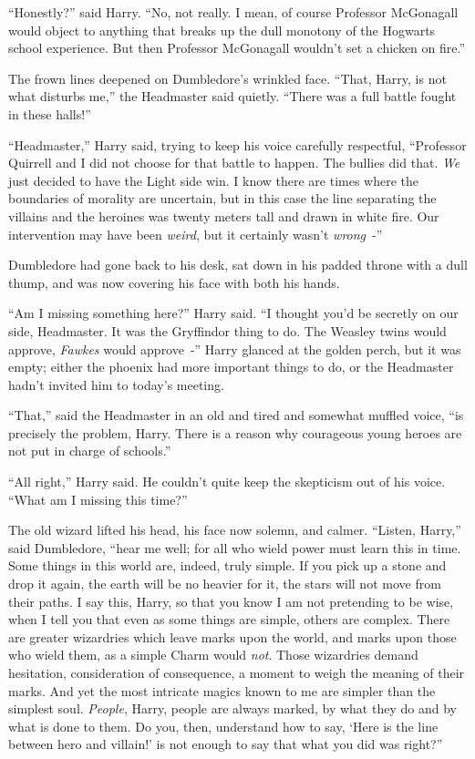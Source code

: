 ``Honestly?'' said Harry. ``No, not really. I mean, of course Professor McGonagall would object to anything that breaks up the dull monotony of the Hogwarts school experience. But then Professor McGonagall wouldn't set a chicken on fire.''

The frown lines deepened on Dumbledore's wrinkled face. ``That, Harry, is not what disturbs me,'' the Headmaster said quietly. ``There was a full battle fought in these halls!''

``Headmaster,'' Harry said, trying to keep his voice carefully respectful, ``Professor Quirrell and I did not choose for that battle to happen. The bullies did that. \emph{We} just decided to have the Light side win. I know there are times where the boundaries of morality are uncertain, but in this case the line separating the villains and the heroines was twenty meters tall and drawn in white fire. Our intervention may have been \emph{weird}, but it certainly wasn't \emph{wrong}~-''

Dumbledore had gone back to his desk, sat down in his padded throne with a dull thump, and was now covering his face with both his hands.

``Am I missing something here?'' Harry said. ``I thought you'd be secretly on our side, Headmaster. It was the Gryffindor thing to do. The Weasley twins would approve, \emph{Fawkes} would approve~-'' Harry glanced at the golden perch, but it was empty; either the phoenix had more important things to do, or the Headmaster hadn't invited him to today's meeting.

``That,'' said the Headmaster in an old and tired and somewhat muffled voice, ``is precisely the problem, Harry. There is a reason why courageous young heroes are not put in charge of schools.''

``All right,'' Harry said. He couldn't quite keep the skepticism out of his voice. ``What am I missing this time?''

The old wizard lifted his head, his face now solemn, and calmer. ``Listen, Harry,'' said Dumbledore, ``hear me well; for all who wield power must learn this in time. Some things in this world are, indeed, truly simple. If you pick up a stone and drop it again, the earth will be no heavier for it, the stars will not move from their paths. I say this, Harry, so that you know I am not pretending to be wise, when I tell you that even as some things are simple, others are complex. There are greater wizardries which leave marks upon the world, and marks upon those who wield them, as a simple Charm would \emph{not}. Those wizardries demand hesitation, consideration of consequence, a moment to weigh the meaning of their marks. And yet the most intricate magics known to me are simpler than the simplest soul. \emph{People}, Harry, people are always marked, by what they do and by what is done to them. Do you, then, understand how to say, `Here is the line between hero and villain!' is not enough to say that what you did was right?''

